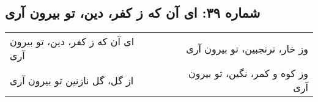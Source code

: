 \begin{center}
\section*{شماره ۳۹: ای آن که ز کفر، دین، تو بیرون آری}
\label{sec:039}
\begin{longtable}{l p{0.5cm} r}
ای آن که ز کفر، دین، تو بیرون آری
&&
وز خار، ترنجبین، تو بیرون آری
\\
از گل، گل نازنین تو بیرون آری
&&
وز کوه و کمر، نگین، تو بیرون آری
\\
\end{longtable}
\end{center}
